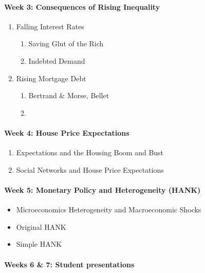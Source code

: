 \documentclass[a4paper,11pt]{article}
\begin{document}
\paragraph{Week 3: Consequences of Rising Inequality}

\begin{enumerate}
\item Falling Interest Rates
  \begin{enumerate}
  \item Saving Glut of the Rich \citep{kumhof2015inequality}
  \item Indebted Demand \citep{mian2021indebted-demand}
  \end{enumerate}
\item Rising Mortgage Debt
  \begin{enumerate}
  \item Bertrand \& Morse, Bellet
  \item \citet{drechsel2021falling-behind}
  \end{enumerate}
\end{enumerate}

\paragraph{Week 4: House Price Expectations}
\begin{enumerate}
\item Expectations and the Housing Boom and Bust \citep{kaplan2018microeconomic}
\item Social Networks and House Price Expectations \citep{bailey2019beliefs-leverage,bailey2018housing}
\end{enumerate}

\paragraph{Week 5: Monetary Policy and Heterogeneity (HANK)}
\begin{itemize}
\item Microeconomics Heterogeneity and Macroeconomic Shocks \citep{kaplan2018microeconomic}
\item Original HANK \citep{kaplan2018monetary}
\item Simple HANK \citep{bilbiie2018analytical}
\end{itemize}

\paragraph{Weeks 6 \& 7: Student presentations}
\end{document}
